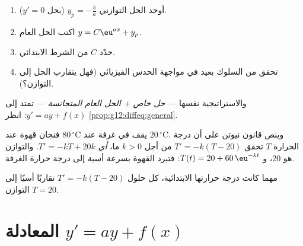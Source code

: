\begin{method}[حل $y' = ay + b$ مع شرط ابتدائي]\label{met:g12:diffeq:solve}
\begin{enumerate}
  \item أوجد الحل التوازني $y_p = -\frac{b}{a}$ (بحل $y' = 0$).
  \item اكتب الحل العام $y = C\eu^{ax} + y_p$.
  \item حدّد $C$ من الشرط الابتدائي.
  \item تحقق من السلوك بعيد  في مواجهة الحدس الفيزيائي (فهل يتقارب
        الحل إلى التوازن؟).
\end{enumerate}
والاستراتيجية نفسها --- \emph{حل خاص + الحل العام 
المتجانسة} --- تمتد إلى $y' = ay + f(x)$: انظر
\cref{prop:g12:diffeq:general}.
\end{method}

\begin{example}\label{ex:g12:diffeq:cooling}
فنجان قهوة عند $80\,^\circ$C يقف في غرفة عند $20\,^\circ$C. وينص قانون نيوتن
على أن درجة الحرارة $T$ تحقق $T' = -k(T - 20)$ من أجل $k > 0$ ما،
\emph{أي} $T' = -kT + 20k$. والتوازن هو $20$، و
$T(t) = 20 + 60\,\eu^{-kt}$: فتبرد القهوة بسرعة أسية إلى درجة حرارة
الغرفة.
\end{example}

\begin{omfigure}

{\small مهما كانت درجة حرارتها الابتدائية،  كل حلول
$T' = -k(T - 20)$ تقاربًا أسيًا إلى التوازن $T = 20$.}
\end{omfigure}

\section{المعادلة \texorpdfstring{$y' = ay + f(x)$}{y' = ay + f(x)}}

